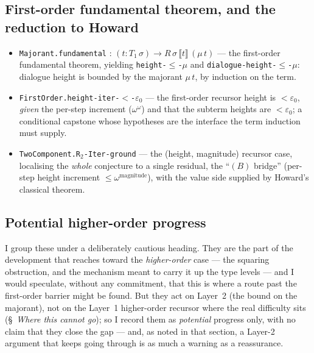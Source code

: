 \documentclass[11pt]{article}
\newcommand{\eps}{\varepsilon_0}
\newcommand{\code}[1]{\texttt{#1}}
\theoremstyle{definition}
\begin{document}
\subsection{First-order fundamental theorem, and the reduction to Howard}

\begin{itemize}
\item \code{Majorant.fundamental} : $(t:T_1\,\sigma)\to R\,\sigma\,\llbracket t
  \rrbracket\,(\mu\,t)$ --- the first-order fundamental theorem, yielding
  \code{height-$\le$-$\mu$} and \code{dialogue-height-$\le$-$\mu$}: dialogue height
  is bounded by the majorant $\mu\,t$, by induction on the term.
\item \code{FirstOrder.height-iter-$<$-$\eps$} --- the first-order recursor height
  is $<\eps$, \emph{given} the per-step increment ($\omega^\omega$) and that the
  subterm heights are $<\eps$; a conditional capstone whose hypotheses are the
  interface the term induction must supply.
\item \code{TwoComponent.R$_2$-Iter-ground} --- the (height, magnitude) recursor
  case, localising the \emph{whole} conjecture to a single residual, the ``$(B)$
  bridge'' (per-step height increment $\le\omega^{\text{magnitude}}$), with the
  value side supplied by Howard's classical theorem.
\end{itemize}

\subsection{Potential higher-order progress}

I group these under a deliberately cautious heading. They are the part of the
development that reaches toward the \emph{higher-order} case --- the squaring
obstruction, and the mechanism meant to carry it up the type levels --- and I
would speculate, without any commitment, that this is where a route past the
first-order barrier might be found. But they act on Layer~2 (the bound on the
majorant), not on the Layer~1 higher-order recursor where the real difficulty
sits (\S~\emph{Where this cannot go}); so I record them as \emph{potential}
progress only, with no claim that they close the gap --- and, as noted in that
section, a Layer-2 argument that keeps going through is as much a warning as a
reassurance.
\end{document}
